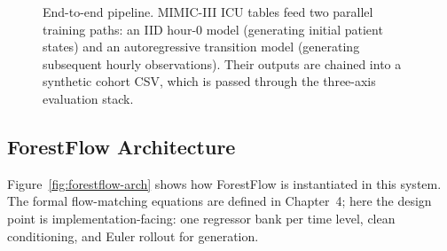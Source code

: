 \begin{figure}[htbp]
\caption{End-to-end pipeline. MIMIC-III ICU tables feed two parallel training paths: an IID hour-0 model (generating initial patient states) and an autoregressive transition model (generating subsequent hourly observations). Their outputs are chained into a synthetic cohort CSV, which is passed through the three-axis evaluation stack.}
\label{fig:pipeline-overview}
\end{figure}

\subsection{ForestFlow Architecture}

Figure~\ref{fig:forestflow-arch} shows how ForestFlow is instantiated in this system. The formal flow-matching equations are defined in Chapter~4; here the design point is implementation-facing: one regressor bank per time level, clean conditioning, and Euler rollout for generation.

